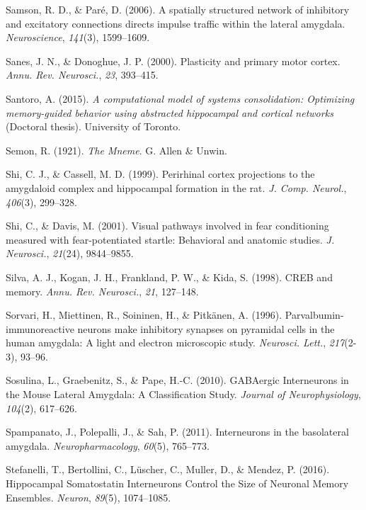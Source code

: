 \documentclass[12pt,a4paperpaper,]{report}
\begin{document}
\hypertarget{ref-samsonux5fspatiallyux5f2006}{}
Samson, R. D., \& Paré, D. (2006). A spatially structured network of
inhibitory and excitatory connections directs impulse traffic within the
lateral amygdala. \emph{Neuroscience}, \emph{141}(3), 1599--1609.

\hypertarget{ref-sanesux5fplasticityux5f2000}{}
Sanes, J. N., \& Donoghue, J. P. (2000). Plasticity and primary motor
cortex. \emph{Annu. Rev. Neurosci.}, \emph{23}, 393--415.

\hypertarget{ref-santoroux5fcomputationalux5f2015}{}
Santoro, A. (2015). \emph{A computational model of systems
consolidation: Optimizing memory-guided behavior using abstracted
hippocampal and cortical networks} (Doctoral thesis). University of
Toronto.

\hypertarget{ref-semonux5fmnemeux5f1921}{}
Semon, R. (1921). \emph{The Mneme}. G. Allen \& Unwin.

\hypertarget{ref-shiux5fperirhinalux5f1999}{}
Shi, C. J., \& Cassell, M. D. (1999). Perirhinal cortex projections to
the amygdaloid complex and hippocampal formation in the rat. \emph{J.
Comp. Neurol.}, \emph{406}(3), 299--328.

\hypertarget{ref-shiux5fvisualux5f2001}{}
Shi, C., \& Davis, M. (2001). Visual pathways involved in fear
conditioning measured with fear-potentiated startle: Behavioral and
anatomic studies. \emph{J. Neurosci.}, \emph{21}(24), 9844--9855.

\hypertarget{ref-silvaux5fcrebux5f1998}{}
Silva, A. J., Kogan, J. H., Frankland, P. W., \& Kida, S. (1998). CREB
and memory. \emph{Annu. Rev. Neurosci.}, \emph{21}, 127--148.

\hypertarget{ref-sorvariux5fparvalbumin-immunoreactiveux5f1996}{}
Sorvari, H., Miettinen, R., Soininen, H., \& Pitkänen, A. (1996).
Parvalbumin-immunoreactive neurons make inhibitory synapses on pyramidal
cells in the human amygdala: A light and electron microscopic study.
\emph{Neurosci. Lett.}, \emph{217}(2-3), 93--96.

\hypertarget{ref-sosulinaux5fgabaergicux5f2010}{}
Sosulina, L., Graebenitz, S., \& Pape, H.-C. (2010). GABAergic
Interneurons in the Mouse Lateral Amygdala: A Classification Study.
\emph{Journal of Neurophysiology}, \emph{104}(2), 617--626.

\hypertarget{ref-spampanatoux5finterneuronsux5f2011}{}
Spampanato, J., Polepalli, J., \& Sah, P. (2011). Interneurons in the
basolateral amygdala. \emph{Neuropharmacology}, \emph{60}(5), 765--773.

\hypertarget{ref-stefanelliux5fhippocampalux5f2016}{}
Stefanelli, T., Bertollini, C., Lüscher, C., Muller, D., \& Mendez, P.
(2016). Hippocampal Somatostatin Interneurons Control the Size of
Neuronal Memory Ensembles. \emph{Neuron}, \emph{89}(5), 1074--1085.
\end{document}
